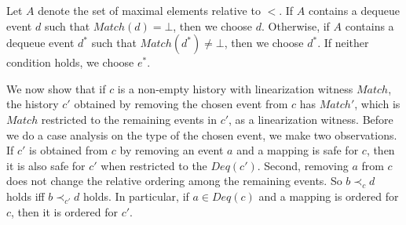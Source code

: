 \documentclass{LMCS}
\newcommand{\Match}{\ensuremath{\mathit{Match}}}
\newcommand{\Deq}[1]{\ensuremath{\mathit{Deq}({#1})}}
\begin{document}
Let $A$ denote the set of maximal elements relative to $<$.
If $A$ contains a dequeue event $d$ such that $\Match(d)=\bot$, then we choose $d$.
Otherwise, if $A$ contains a dequeue event $d^*$ such that $\Match(d^*)\neq\bot$, then we choose $d^*$.
If neither condition holds, we choose $e^*$.

We now show that if $c$ is a non-empty history with linearization witness $\Match$, the history $c'$ obtained by removing the chosen event from $c$ has $\Match'$, which is $\Match$ restricted to the remaining events in $c'$, as a linearization witness.
Before we do a case analysis on the type of the chosen event, we make two observations. 
If $c'$ is obtained from $c$ by removing an event $a$ and a mapping is safe for $c$, then it is also safe for $c'$ when restricted to the $\Deq {c'}$.
Second, removing $a$ from $c$ does not change the relative ordering among the remaining events.
So $b\prec_c d$ holds iff $b\prec_{c'} d$ holds.
In particular, if $a\in \Deq c$ and a mapping is ordered for $c$, then it is ordered for $c'$.
\end{document}
